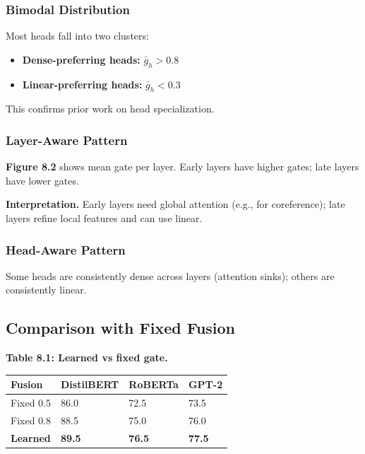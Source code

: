 \subsubsection{Bimodal Distribution}

Most heads fall into two clusters:

\begin{itemize}
\item \textbf{Dense-preferring heads:} $\bar{g}_h > 0.8$
\item \textbf{Linear-preferring heads:} $\bar{g}_h < 0.3$

\end{itemize}
This confirms prior work on head specialization.

\subsubsection{Layer-Aware Pattern}

\textbf{Figure 8.2} shows mean gate per layer. Early layers have higher gates; 
late layers have lower gates.

\textbf{Interpretation.} Early layers need global attention (e.g., for 
coreference); late layers refine local features and can use linear.

\subsubsection{Head-Aware Pattern}

Some heads are consistently dense across layers (attention sinks); others 
are consistently linear.

\subsection{Comparison with Fixed Fusion}

\textbf{Table 8.1: Learned vs fixed gate.}

\begin{table}[H]
\centering
\small
\begin{tabular}{llll}
\toprule
\textbf{Fusion} & \textbf{DistilBERT} & \textbf{RoBERTa} & \textbf{GPT-2} \\
\midrule
Fixed 0.5 & 86.0 & 72.5 & 73.5 \\
Fixed 0.8 & 88.5 & 75.0 & 76.0 \\
\textbf{Learned} & \textbf{89.5} & \textbf{76.5} & \textbf{77.5} \\
\bottomrule
\end{tabular}
\end{table}

